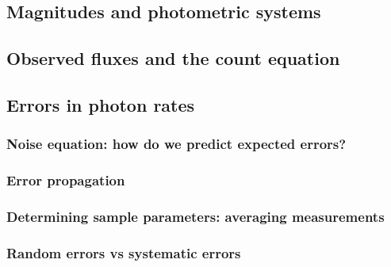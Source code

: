\documentclass[12pt]{article}
\begin{document}
\subsection*{Magnitudes and photometric systems}
\subsection*{Observed fluxes and the count equation}
\subsection*{Errors in photon rates}
\subsubsection*{Noise equation: how do we predict expected errors?}
\subsubsection*{Error propagation}
\subsubsection*{Determining sample parameters: averaging measurements}
\subsubsection*{Random errors vs systematic errors}
\end{document}
